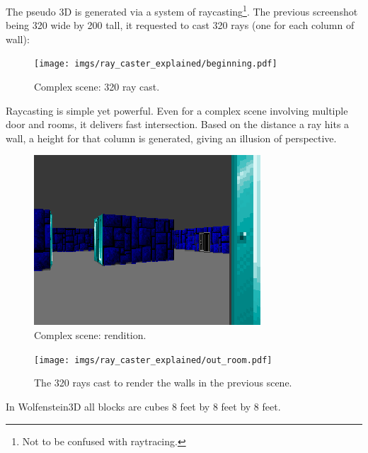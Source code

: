 \documentclass[book.tex]{subfiles}
\begin{document}
 The pseudo 3D is generated via a system of raycasting\footnote{Not to be confused with raytracing.}. The previous screenshot being 320 wide by 200 tall, it requested to cast 320 rays (one for each column of wall):

\begin{figure}[H]
  \centering
  \texttt{[image: imgs/ray\_caster\_explained/beginning.pdf]}
 \caption{Complex scene: 320 ray cast.} 
\end{figure}

Raycasting is simple yet powerful. Even for a complex scene involving multiple door and rooms, it delivers fast intersection. Based on the distance a ray hits a wall, a height for that column is generated, giving an illusion of perspective.
\begin{figure}[H]
  \centering
 \includegraphics[width=\textwidth]{imgs/ray_caster_explained/out_door.png}
 \caption{Complex scene: rendition.} 
\end{figure}
\par
\begin{figure}[H]
\centering
 \texttt{[image: imgs/ray\_caster\_explained/out\_room.pdf]}
 \caption{The 320 rays cast to render the walls in the previous scene.} \label{fig:Raycasting2}
\end{figure}
In Wolfenstein3D all blocks are cubes 8 feet by 8 feet by 8 feet.
\end{document}
